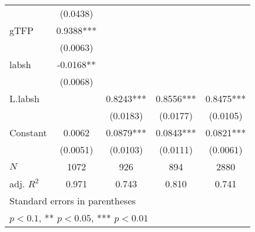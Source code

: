 \begin{table}[htbp]
\begin{tabular}{l*{4}{c}}
            &    (0.0438)   &               &               &               \\
[1em]
gTFP        &      0.9388***&               &               &               \\
            &    (0.0063)   &               &               &               \\
[1em]
labsh       &     -0.0168** &               &               &               \\
            &    (0.0068)   &               &               &               \\
[1em]
L.labsh     &               &      0.8243***&      0.8556***&      0.8475***\\
            &               &    (0.0183)   &    (0.0177)   &    (0.0105)   \\
[1em]
Constant    &      0.0062   &      0.0879***&      0.0843***&      0.0821***\\
            &    (0.0051)   &    (0.0103)   &    (0.0111)   &    (0.0061)   \\
\hline
\(N\)       &        1072   &         926   &         894   &        2880   \\
adj. \(R^{2}\)&       0.971   &       0.743   &       0.810   &       0.741   \\
\hline\hline
\multicolumn{5}{l}{\footnotesize Standard errors in parentheses}\\
\multicolumn{5}{l}{\footnotesize * \(p<0.1\), ** \(p<0.05\), *** \(p<0.01\)}\\
\end{tabular}
\end{table}
